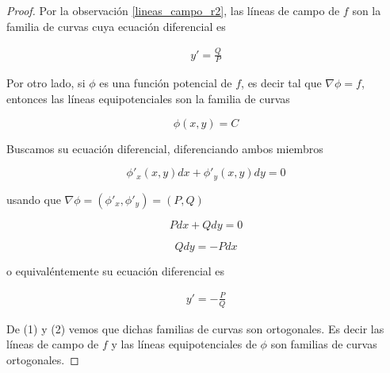 \begin{proof}
Por la observación \ref{lineas_campo_r2}, las líneas de campo de $f$ son la familia de curvas cuya ecuación diferencial es

\setcounter{equation}{0}

\begin{eqnarray} y' = \frac{Q}{P} \end{eqnarray}

Por otro lado, si $\phi$ es una función potencial de $f$, es decir tal que $\nabla \phi = f$, entonces las líneas equipotenciales son la familia de curvas

$$ \phi(x,y) = C $$

Buscamos su ecuación diferencial, diferenciando ambos miembros

$$ \phi'_x(x,y) dx + \phi'_y(x,y) dy = 0 $$

usando que $\nabla \phi = (\phi'_x, \phi'_y) = (P,Q)$

$$ P dx + Q dy = 0 $$

$$ Q dy = - P dx $$

o equivaléntemente su ecuación diferencial es

\begin{eqnarray} y' = - \frac{P}{Q} \end{eqnarray}

De (1) y (2) vemos que dichas familias de curvas son ortogonales.  Es decir las líneas de campo de $f$ y las líneas equipotenciales de $\phi$ son familias de curvas ortogonales.
\end{proof}
